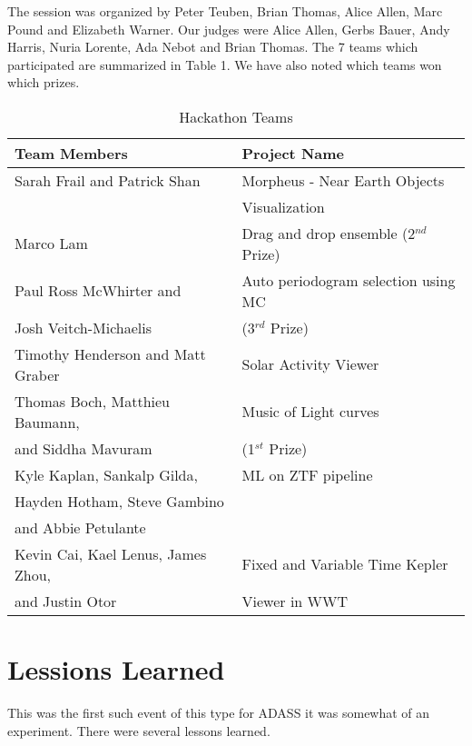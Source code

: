 \documentclass[11pt,twoside]{article}
\begin{document}
The session was organized by Peter Teuben, Brian Thomas, Alice Allen, Marc Pound and Elizabeth Warner. Our judges were Alice Allen, Gerbs Bauer, Andy Harris, Nuria Lorente, Ada Nebot and Brian Thomas. The 7 teams which participated are summarized in Table 1. We have also noted which teams won which prizes.

\begin{table}
\caption{Hackathon Teams} \label{tab:title} 
\begin{center}
\begin{tabular}{|l|l|} \hline 
{\bf Team Members} & {\bf Project Name } \\ \hline\hline 
Sarah Frail and Patrick Shan & Morpheus - Near Earth Objects \\ \hline 
 & Visualization \\ \hline
	Marco Lam &  Drag and drop ensemble (2$^{nd}$ Prize) \\ \hline 
Paul Ross McWhirter and & Auto periodogram selection using MC \\ 
	Josh Veitch-Michaelis &  (3$^{rd}$ Prize) \\ \hline 
Timothy Henderson and Matt Graber &  Solar Activity Viewer \\ \hline 
Thomas Boch, Matthieu Baumann, & Music of Light curves \\
	and Siddha Mavuram & (1$^{st}$ Prize) \\ \hline
Kyle Kaplan, Sankalp Gilda, & ML on ZTF pipeline \\ 
Hayden Hotham, Steve Gambino & \\ 
and Abbie Petulante & \\ \hline 
Kevin Cai, Kael Lenus, James Zhou, & Fixed and Variable Time Kepler \\ 
and Justin Otor &  Viewer in WWT \\ \hline\hline 
\end{tabular}
\end{center}
\end{table}

\section*{Lessions Learned}


This was the first such event of this type for ADASS it was somewhat of an experiment. There were several lessons learned.
\end{document}
